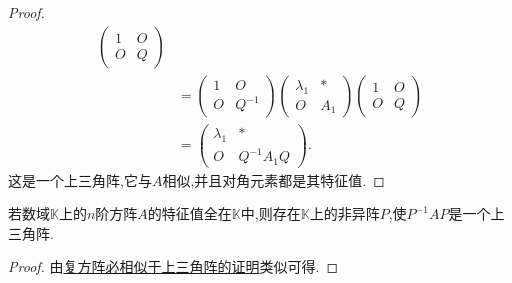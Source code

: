 \documentclass[../../main.tex]{subfiles}
\begin{document}
\begin{proof}
\begin{align*}
\begin{pmatrix}
1 & O \\
O & Q
\end{pmatrix} \\
&= \begin{pmatrix}
1 & O \\
O & Q^{-1}
\end{pmatrix} \begin{pmatrix}
\lambda_1 & * \\
O & A_1
\end{pmatrix} \begin{pmatrix}
1 & O \\
O & Q
\end{pmatrix} \\
&= \begin{pmatrix}
\lambda_1 & * \\
O & Q^{-1}A_1Q
\end{pmatrix}.
\end{align*}
这是一个上三角阵,它与$A$相似,并且对角元素都是其特征值.
\end{proof}

\begin{corollary}\label{corollary:特征值全在矩阵元素的数域中则一定相似于上三角阵}
若数域$\mathbb{K}$上的$n$阶方阵$A$的特征值全在$\mathbb{K}$中,则存在$\mathbb{K}$上的非异阵$P$,使$P^{-1}AP$是一个上三角阵.
\end{corollary}
\begin{proof}
由\hyperref[theorem:复方阵必相似于上三角阵]{复方阵必相似于上三角阵的证明}类似可得.
\end{proof}
\end{document}
